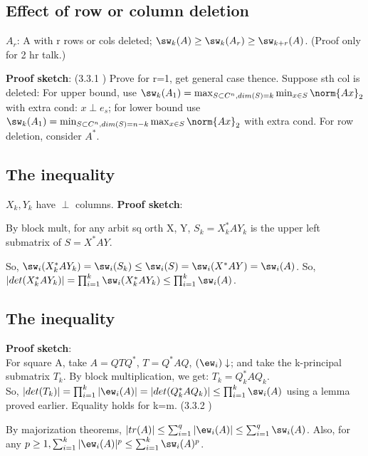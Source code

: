 \documentclass[10pt]{amsart}
\newcommand{\proofSketch}{\textbf{Proof sketch}}
\begin{document}
\subsection{Effect of row or column deletion}
$A_{r}$: A with r rows or cols deleted; $\sw_{k}(A) \geq \sw_{k}(A_{r}) \geq \sw_{k+r}(A)$. (Proof only for 2 hr talk.)

\proofSketch: (3.3.1 \cite{hornJohnsonTopics}) Prove for r=1, get general case thence. Suppose sth col is deleted: For upper bound, use $\sw_{k}(A_{1}) = \max_{S \subset C^{n}, dim(S) = k} \min_{x \in S} \norm{Ax}_{2}$ with extra cond: $x \perp e_{s}$; for lower bound use \\
$\sw_{k}(A_{1}) = \min_{S \subset C^{n}, dim(S) = n-k} \max_{x \in S} \norm{Ax}_{2}$ with extra cond. For row deletion, consider $A^{*}$.

\subsection{The inequality }
$X_{k}, Y_{k}$ have $\perp$ columns. \proofSketch:

By block mult, for any arbit sq orth X, Y, $S_{k} = X_{k}^{*}AY_{k}$ is the upper left submatrix of $S = X^{*}AY$.

So, $\sw_{i}(X_{k}^{*}AY_{k}) = \sw_{i}(S_{k}) \leq \sw_{i}(S)  = \sw_{i}(X^{*}AY) = \sw_{i}(A)$. So, $|det(X_{k}^{*}AY_{k})| = \prod_{i=1}^{k} \sw_{i}(X_{k}^{*}AY_{k}) \leq \prod_{i=1}^{k} \sw_{i}(A)$.

\subsection{The inequality }
\proofSketch:\\
For square A, take $A = QTQ^{*}$, $T = Q^{*}AQ$, $(\ew_{i}) \downarrow$; and take the k-principal submatrix $T_{k}$. By block multiplication, we get: $T_{k} = Q_{k}^{*}AQ_{k}$.\\
So, $|det(T_{k})| = \prod_{i=1}^{k}|\ew_{i}(A)| = |det(Q_{k}^{*}AQ_{k})| \leq \prod_{i=1}^{k} \sw_{i}(A)$ using a lemma proved earlier. Equality holds for k=m. (3.3.2 \cite{hornJohnsonTopics})

By majorization theorems, $|tr(A)| \leq \sum_{i=1}^{q} |\ew_{i}(A)| \leq \sum_{i=1}^{q} \sw_{i}(A)$. Also, for any $p\geq1, \sum_{i=1}^{k} |\ew_{i}(A)|^{p} \leq \sum_{i=1}^{k} \sw_{i}(A)^{p}$.
\end{document}
